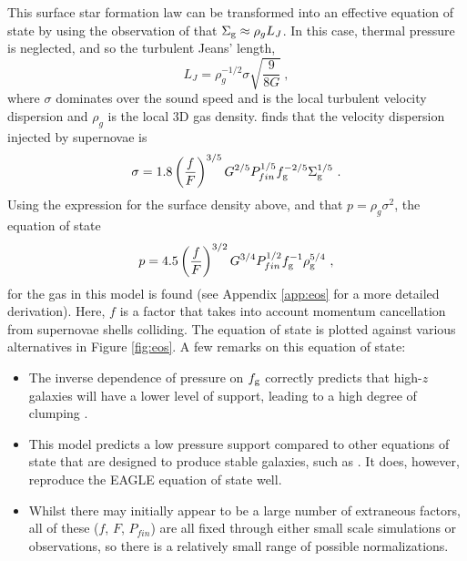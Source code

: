 This surface star formation law can be transformed into an effective equation of state by using the observation of \citet{schaye_model-independent_2001} that $\Sigma_\mathrm{g} \approx \rho_g L_J$.
In this case, thermal pressure is neglected, and so the turbulent Jeans' length,
\begin{equation}
\label{eqn:jeans}
L_J = \rho_g^{-1/2} \sigma \sqrt{\frac{9}{8G}}~,
\end{equation}
where $\sigma$ dominates over the sound speed and is the local turbulent velocity dispersion and $\rho_g$ is the local 3D gas density.
\citet{martizzi_supernova_2015} finds that the velocity dispersion injected by supernovae is
\begin{equation}
\label{eqn:martdisp}
\sigma = 1.8 \left(\frac{f}{F}\right)^{{3/5}} G^{{2/5}} P_{fin}^{{1/5}} f_\mathrm{g}^{{-2/5}} \Sigma_\mathrm{g}^{{1/5}}~.
\end{equation}
Using the expression for the surface density above, and that $p = \rho_g \sigma^2$, the equation of state
\begin{equation}
\label{eqn:eos}
p = 4.5\left(\frac{f}{F}\right)^{{3/2}} G^{{3/4}} P_{fin}^{{1/2}} f_\mathrm{g}^{-1} \rho_\mathrm{g}^{{5/4}}~,
\end{equation}
for the gas in this model is found (see Appendix \ref{app:eos} for a more detailed derivation).
Here, $f$ is a factor that takes into account momentum cancellation from supernovae shells colliding.
The equation of state is plotted against various alternatives in Figure \ref{fig:eos}. A few remarks on this equation of state:
\begin{itemize}
    \item The inverse dependence of pressure on $f_\mathrm{g}$ correctly predicts that high-$z$ galaxies will have a lower level of support, leading to a high degree of clumping \citep{bournaud_long_2014}.
    \item This model predicts a low pressure support compared to other equations of state that are designed to produce stable galaxies, such as \citet{springel_cosmological_2003}. It does, however, reproduce the EAGLE equation of state well.
    \item Whilst there may initially appear to be a large number of extraneous factors, all of these ($f$, $F$, $P_{fin}$) are all fixed through either small scale simulations or observations, so there is a relatively small range of possible normalizations.
\end{itemize}
